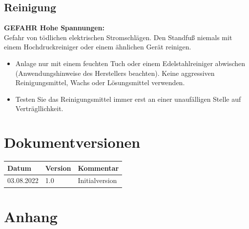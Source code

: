 \documentclass[a4paper,10pt]{article}
\newcommand{\warn}[1]{\begin{tcolorbox}[colback=boxred,colframe=red,coltext=
white,title=Warnung]#1\end{tcolorbox}}
\begin{document}
\begin{multicols*}{2}
	\subsection{Reinigung}
	\warn{\textbf{GEFAHR Hohe Spannungen:}\\Gefahr von tödlichen elektrischen
	Stromschlägen. Den Standfuß niemals mit einem Hochdruckreiniger oder einem ähnlichen Gerät reinigen.}
	\begin{itemize}
		\item Anlage nur mit einem feuchten Tuch oder einem Edelstahlreiniger abwischen (Anwendungshinweise des Herstellers beachten). Keine aggressiven Reinigungsmittel, Wachs oder Lösungsmittel verwenden. 
		\item Testen Sie das Reinigungsmittel immer erst an einer unaufälligen Stelle auf Verträgllichkeit.
	\end{itemize}

	\section{Dokumentversionen}
	\begin{tabular}{lll}
		\toprule
		Datum      & Version & Kommentar                   \\
		\midrule
		03.08.2022 & 1.0     & Initialversion              \\
		\bottomrule
	\end{tabular}

	\end{multicols*}

	\section{Anhang}
\end{document}
